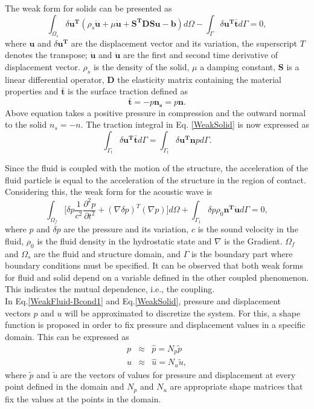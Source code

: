 The weak form for solids can be presented as
\begin{equation}
\int_{\Omega_s} \delta \mathbf{u^T}(\rho_s \ddot{\mathbf{u}}+\mu \dot{\mathbf{u}}+ \mathbf{S^TDSu}-\mathbf{b}) d\Omega - \int_{\Gamma} \delta \mathbf{u^T}\bar{\mathbf{t}} d\Gamma = 0, 
\label{WeakSolid}
\end{equation}
where $\mathbf{u}$ and $\delta \mathbf{u^T}$ are the displacement vector and its variation, the superscript $T$ denotes the transpose; $\dot{\mathbf{u}}$ and $\ddot{\mathbf{u}}$ are the first and second time derivative of displacement vector. $\rho_s$ is the density of the solid, $\mu$ a damping constant, $\mathbf{S}$ is a linear differential operator, $\mathbf{D}$ the elasticity matrix containing the material properties and $\bar{\mathbf{t}}$ is the surface traction defined as
\[
\bar{\mathbf{t}}=-p\mathbf{n_s}= p\mathbf{n}.
\]
Above equation takes a positive pressure in compression and the outward normal to the solid $n_s=-n$. The traction integral in Eq. \ref{WeakSolid} is now expressed as
\[
\int_{\Gamma_t} \delta \mathbf{u^T} \bar{\mathbf{t}} d\Gamma = \int_{\Gamma_t} \delta \mathbf{u^T n}p d\Gamma.
\]

Since the fluid is coupled with the motion of the structure, the acceleration of the fluid particle is equal to the acceleration of the structure in the region of contact. Considering this, the weak form for the acoustic wave is
\begin{equation}
\int_{\Omega_f} \biggr[\delta p \frac{1}{c^2}\frac{\partial^2p}{\partial t^2}+(\nabla \delta p)^T (\nabla p) \biggr] d\Omega + \int_{\Gamma_1} \delta p \rho_0 \mathbf{n^T} \ddot{\mathbf{u}} d\Gamma = 0,
\label{WeakFluid-Bcond1}
\end{equation}
where $p$ and $\delta p$ are the pressure and its variation, $c$ is the sound velocity in the fluid, $\rho_0$ is the fluid density in the hydrostatic state and $\nabla$ is the Gradient. $\Omega_f$ and $\Omega_s$ are the fluid and structure domain, and $\Gamma$ is the boundary part where boundary conditions must be specified. It can be observed that both weak forms for fluid and solid depend on a variable defined in the other coupled phenomenon. This indicates the mutual dependence, i.e., the coupling.\\

In Eq.\ref{WeakFluid-Bcond1} and Eq.\ref{WeakSolid}, pressure and displacement vectors $p$ and $u$ will be approximated to discretize the system. For this, a shape function is proposed in order to fix pressure and displacement values in a specific domain. This can be expressed as
\begin{eqnarray*}
p & \approx & \hat{p}= N_p\tilde{p}\\
u & \approx & \hat{u}= N_u\tilde{u},
\end{eqnarray*}
where $\tilde{p}$ and $\tilde{u}$ are the vectors of values for pressure and displacement at every point defined in the domain and $N_p$ and $N_u$ are appropriate shape matrices that fix the values at the points in the domain. \\

